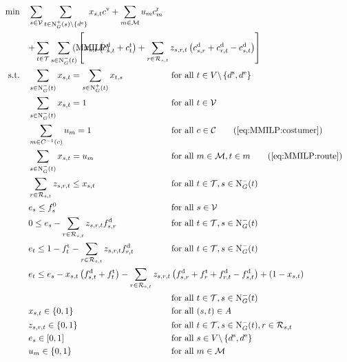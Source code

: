 \begin{align}
	\min \quad & \sum_{s\in\mathcal{V}} \sum_{t\in\Nout(s)\backslash\{d^{\operatorname{e}}\}} x_{s,t}\cv + \sum_{m\in\mathcal{M}} u_m \croute_m \nonumber \\
	& \omit\rlap{$\displaystyle{ + \sum_{t\in\mathcal{T}} \sum_{s\in\Nin(t)} \left[x_{s,t}\left(\cd_{s,t}+\ct_{t}\right) + \sum_{r\in\Rst} z_{s,r,t}\left(\cd_{s,r}+\cd_{r,t}-\cd_{s,t}\right)\right]}$} \tag{MMILP} \label{eq:MMILP} \\
	\text{s.t.} \quad & \sum_{s\in\Nin(t)} x_{s,t} = \sum_{s\in\Nout(t)} x_{t,s} & & \text{for all } t\in V\backslash\left\{d^{\operatorname{s}},d^{\operatorname{e}}\right\} \label{eq:MMILP:flow} \\
	& \sum_{s\in\Nin(t)} x_{s,t} = 1 & & \text{for all } t\in\mathcal{V} \label{eq:MMILP:vehicles} \\
	& \sum_{m\in C^{-1}(c)} u_m = 1 && \text{for all } c\in\mathcal{C} \tag{\ref{eq:MMILP:costumer}} \\
	& \sum_{s\in\Nin(t)} x_{s,t} = u_m && \text{for all } m\in\mathcal{M}, t\in m \tag{\ref{eq:MMILP:route}} \\
	& \sum_{r\in\Rst} z_{s,r,t} \leq x_{s,t} & & \text{for all } t\in\mathcal{T}, s\in\Nin(t) \label{eq:MMILP:refuel} \\
	& e_s \leq f_s^0 & & \text{for all } s\in\mathcal{V} \label{eq:MMILP:initial_fuel} \\
	& 0 \leq e_s - \sum_{r\in\Rst} z_{s,r,t}\fd_{s,r} & & \text{for all } t\in\mathcal{T}, s\in\Nin(t) \label{eq:MMILP:min_fuel} \\
	& e_t \leq 1 - \ft_t - \sum_{r\in\Rst} z_{s,r,t}\fd_{r,t} & & \text{for all } t\in\mathcal{T}, s\in\Nin(t) \label{eq:MMILP:max_fuel} \\
	& \omit\rlap{$\displaystyle{e_t \leq e_s - x_{s,t}\left(f_{s,t}^{\operatorname{d}}+f_t^{\operatorname{t}}\right) - \sum_{r\in\Rst} z_{s,r,t}\left(\fd_{s,r}+\ft_r+\fd_{r,t}-\fd_{s,t}\right) + \left(1-x_{s,t}\right)}$} \nonumber \\
	& & & \text{for all } t\in\mathcal{T}, s\in\Nin(t) \label{eq:MMILP:fuel_consumption} \\
	& x_{s,t}\in\{0,1\} & & \text{for all } (s,t)\in A \label{eq:MMILP_xst} \\
	& z_{s,r,t}\in\{0,1\} & & \text{for all } t\in\mathcal{T},s\in\Nin(t),r\in\Rst \label{eq:MMILP:zsrt} \\
	& e_s\in[0,1] & & \text{for all } s\in V\backslash\left\{d^{\operatorname{s}},d^{\operatorname{e}}\right\} \label{eq:MMILP:es} \\
	& u_m\in\{0,1\} && \text{for all } m\in\mathcal{M} \label{eq:MMILP:um}
\end{align}